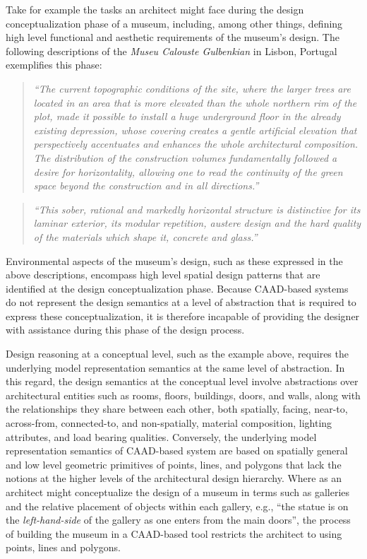 \documentclass[12pt]{ucthesis}
\begin{document}
Take for example the tasks an architect might face during the design conceptualization phase of a museum, including, among other things, defining high level functional and aesthetic requirements of the museum's design. The following descriptions of the \emph{Museu Calouste Gulbenkian} in Lisbon, Portugal exemplifies this phase:
\begin{quote}
\emph{``The current topographic conditions of the site, where the larger trees are located in an area that is more elevated than the whole northern rim of the plot, made it possible to install a huge underground floor in the already existing depression, whose covering creates a gentle artificial elevation that perspectively accentuates and enhances the whole architectural composition. The distribution of the construction volumes fundamentally followed a desire for horizontality, allowing one to read the continuity of the green space beyond the construction and in all directions.''}
\end{quote}
\begin{quote}
\emph{``This sober, rational and markedly horizontal structure is distinctive for its laminar exterior, its modular repetition, austere design and the hard quality of the materials which shape it, concrete and glass.''}
\end{quote}
Environmental aspects of the museum's design, such as these expressed in the above descriptions, encompass high level spatial design patterns that are identified at the design conceptualization phase. Because CAAD-based systems do not represent the design semantics at a level of abstraction that is required to express these conceptualization, it is therefore incapable of providing the designer with assistance during this phase of the design process.

Design reasoning at a conceptual level, such as the example above, requires the underlying model representation semantics at the same level of abstraction. In this regard, the design semantics at the conceptual level involve abstractions over architectural entities such as rooms, floors, buildings, doors, and walls, along with the relationships they share between each other, both spatially, facing, near-to, across-from, connected-to, and non-spatially, material composition, lighting attributes, and load bearing qualities. Conversely, the underlying model representation semantics of CAAD-based system are based on spatially general and low level geometric primitives of points, lines, and polygons that lack the notions at the higher levels of the architectural design hierarchy. Where as an architect might conceptualize the design of a museum in terms such as galleries and the relative placement of objects within each gallery, e.g., ``the statue is on the \emph{left-hand-side} of the gallery as one enters from the main doors'', the process of building the museum in a CAAD-based tool restricts the architect to using points, lines and polygons. 
\end{document}
